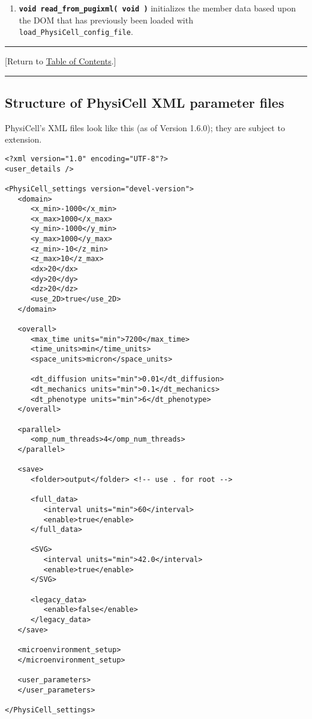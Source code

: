 \documentclass[12pt]{article}
\renewcommand{\v}{\verb}
\newcommand{\smallcode}[1]{\textbf{\texttt{#1}}}
\newcommand{\TOClink}{\begin{center}\hrule\vskip-5pt\phantom{.}\hfill[Return to \hyperlink{TOC}{Table of Contents}.]\hfill\phantom{.}\vskip3pt\hrule\end{center}}
\begin{document}
\begin{enumerate}
\item 
\smallcode{void read\_from\_pugixml( void )} initializes the member data 
based upon the DOM that has previously been loaded with 
\v|load_PhysiCell_config_file|. 

\end{enumerate}

\TOClink 


\subsection{Structure of PhysiCell XML parameter files}
\label{sec:XML_PhysiCell_structure}
PhysiCell's XML files look like this (as of Version 1.6.0); they 
are subject to extension. 

\begin{verbatim}
<?xml version="1.0" encoding="UTF-8"?>
<user_details />

<PhysiCell_settings version="devel-version">
   <domain>
      <x_min>-1000</x_min>
      <x_max>1000</x_max>
      <y_min>-1000</y_min>
      <y_max>1000</y_max>
      <z_min>-10</z_min>
      <z_max>10</z_max>
      <dx>20</dx>
      <dy>20</dy>
      <dz>20</dz>
      <use_2D>true</use_2D>
   </domain>
   
   <overall>
      <max_time units="min">7200</max_time>  
      <time_units>min</time_units>
      <space_units>micron</space_units>
      
      <dt_diffusion units="min">0.01</dt_diffusion>
      <dt_mechanics units="min">0.1</dt_mechanics>
      <dt_phenotype units="min">6</dt_phenotype>	
   </overall>
   
   <parallel>
      <omp_num_threads>4</omp_num_threads>
   </parallel> 
   
   <save>
      <folder>output</folder> <!-- use . for root --> 

      <full_data>
         <interval units="min">60</interval>
         <enable>true</enable>
      </full_data>
      
      <SVG>
         <interval units="min">42.0</interval>
         <enable>true</enable>
      </SVG>
      
      <legacy_data>
         <enable>false</enable>
      </legacy_data>
   </save>
   
   <microenvironment_setup>
   </microenvironment_setup>
   
   <user_parameters>
   </user_parameters>

</PhysiCell_settings>
\end{verbatim}
\end{document}
